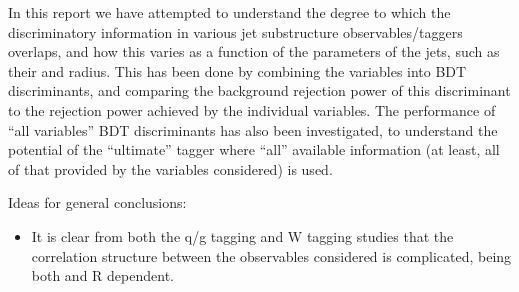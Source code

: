 In this report we have attempted to understand the degree to which the discriminatory information in various jet substructure observables/taggers overlaps, and how this varies as a function of the parameters of the jets, such as their \pt and radius. This has been done by combining the variables into BDT discriminants, and comparing the background rejection power of this discriminant to the rejection power achieved by the individual variables. The performance of ``all variables'' BDT discriminants has also been investigated, to understand the potential of the ``ultimate'' tagger where ``all'' available information (at least, all of that provided by the variables considered) is used. 

Ideas for general conclusions:
\begin{itemize}
\item It is clear from both the q/g tagging and W tagging studies that the correlation structure between the observables considered is complicated, being both \pt and R dependent.
\end{itemize}

